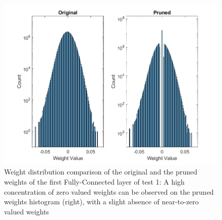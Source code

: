 \begin{figure} [H]
	\centering
	\includegraphics[width=\textwidth]{Images/Weights-distributions/pruned/37.97/weight-distribution-FC1.png}
	\decoRule
	\caption[Weight distribution comparison of the original and the pruned weights of the first Fully-Connected layer of test 1]{Weight distribution comparison of the original and the pruned weights of the first Fully-Connected layer of test 1: A high concentration of zero valued weights can be observed on the pruned weights histogram (right), with a slight absence of near-to-zero valued weights}
	\label{fig:weight-distribution-comparison-pruned-FC1-test1}
\end{figure}
